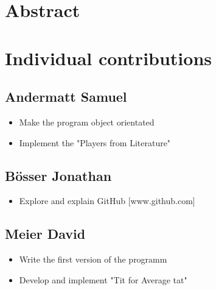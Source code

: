 \documentclass[11pt,twoside]{article}
\begin{document}



\tableofcontents

\newpage


\renewcommand{\lstlistlistingname}{Matlabcode}
\lstlistoflistings
\cite{lamport94}

\listoffigures 
 \listoftables
\newpage
{}

\section{Abstract}

\section{Individual contributions}

\subsection{Andermatt Samuel}
\begin{itemize}
\item Make the program object orientated
\item Implement the "Players from Literature"
\end{itemize}

\subsection{B\"osser Jonathan}
\begin{itemize}
\item Explore and explain GitHub [www.github.com]
\end{itemize}

\subsection{Meier David}
\begin{itemize}
\item Write the first version of the programm
\item Develop and implement "Tit for Average tat"
\end{itemize}
\end{document}
